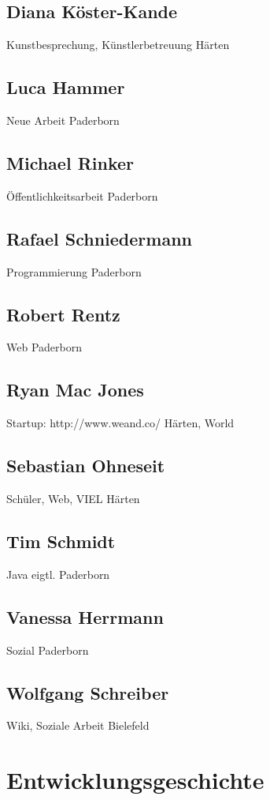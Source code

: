 \begin{appendix}
\section{Diana Köster-Kande}
Kunstbesprechung, Künstlerbetreuung
Härten

\section{Luca Hammer}
Neue Arbeit
Paderborn

\section{Michael Rinker}
Öffentlichkeitsarbeit
Paderborn

\section{Rafael Schniedermann}
Programmierung
Paderborn

\section{Robert Rentz}
Web
Paderborn

\section{Ryan Mac Jones}
Startup: http://www.weand.co/
Härten, World

\section{Sebastian Ohneseit}
Schüler, Web, VIEL
Härten

\section{Tim Schmidt}
Java
eigtl. Paderborn

\section{Vanessa Herrmann}
Sozial
Paderborn

\section{Wolfgang Schreiber}
Wiki, Soziale Arbeit
Bielefeld


\chapter{Entwicklungsgeschichte}

\end{appendix}
